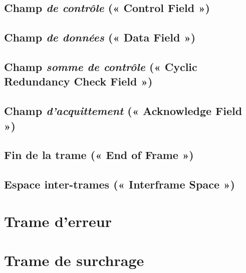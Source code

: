 \subsection{Champ \emph{de contrôle} (« Control Field »)}


\subsection{Champ \emph{de données} (« Data Field »)}


\subsection{Champ \emph{somme de contrôle} (« Cyclic Redundancy Check Field »)}


\subsection{Champ \emph{d'acquittement} (« Acknowledge Field »)}



\subsection{Fin de la trame (« End of Frame »)}



\subsection{Espace inter-trames (« Interframe Space »)}


\section{Trame d'erreur}





\section{Trame de surchrage}




